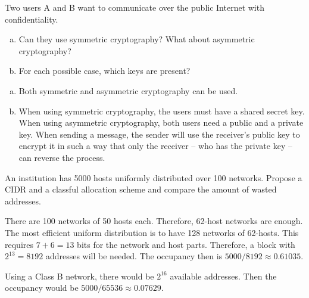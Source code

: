 \begin{Exercise}
\end{Exercise}

\begin{Exercise}
Two users A and B want to communicate over the public Internet with confidentiality.
\begin{enumerate}[a)]
\item Can they use symmetric cryptography? What about asymmetric cryptography?
\item For each possible case, which keys are present?
\end{enumerate}
\end{Exercise}
\begin{Answer}
\begin{enumerate}[a)]
\item Both symmetric and asymmetric cryptography can be used.
\item When using symmetric cryptography, the users must have a shared secret key. When using asymmetric cryptography, both users need a public and a private key.
When sending a message, the sender will use the receiver's public key to encrypt it in such a way that only the receiver -- who has the private key -- can reverse the process.
\end{enumerate}
\end{Answer}

\begin{Exercise}
An institution has 5000 hosts uniformly distributed over 100 networks.
Propose a CIDR and a classful allocation scheme and compare the amount of wasted addresses.
\end{Exercise}
\begin{Answer}
There are 100 networks of 50 hosts each. Therefore, 62-host networks are enough.
The most efficient uniform distribution is to have 128 networks of 62-hosts.
This requires \(7 + 6 = 13\) bits for the network and host parts.
Therefore, a block with \(2^{13} = 8192\) addresses will be needed.
The occupancy then is \(5000 / 8192 \approx 0.61035\).

Using a Class B network, there would be \(2^{16}\) available addresses.
Then the occupancy would be \(5000 / 65536 \approx 0.07629\).
\end{Answer}

